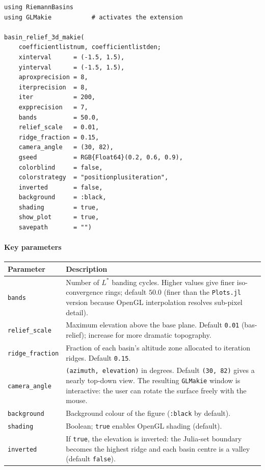 \documentclass[11pt,a4paper]{article}
\theoremstyle{definition}
\newcommand{\pkg}[1]{\texttt{#1}}
\begin{document}
\begin{lstlisting}
using RiemannBasins
using GLMakie           # activates the extension

basin_relief_3d_makie(
    coefficientlistnum, coefficientlistden;
    xinterval      = (-1.5, 1.5),
    yinterval      = (-1.5, 1.5),
    aproxprecision = 8,
    iterprecision  = 8,
    iter           = 200,
    expprecision   = 7,
    bands          = 50.0,
    relief_scale   = 0.01,
    ridge_fraction = 0.15,
    camera_angle   = (30, 82),
    gseed          = RGB{Float64}(0.2, 0.6, 0.9),
    colorblind     = false,
    colorstrategy  = "positionplusiteration",
    inverted       = false,
    background     = :black,
    shading        = true,
    show_plot      = true,
    savepath       = "")
\end{lstlisting}

\paragraph{Key parameters}

\begin{center}
\renewcommand{\arraystretch}{1.25}
\begin{tabular}{lp{8.5cm}}
\toprule
Parameter & Description \\
\midrule
\texttt{bands} &
  Number of $L^*$ banding cycles.  Higher values give finer iso-convergence
  rings; default $50.0$ (finer than the \pkg{Plots.jl} version because
  OpenGL interpolation resolves sub-pixel detail).\\
\texttt{relief\_scale} &
  Maximum elevation above the base plane.  Default \texttt{0.01}
  (bas-relief); increase for more dramatic topography.\\
\texttt{ridge\_fraction} &
  Fraction of each basin's altitude zone allocated to iteration ridges.
  Default \texttt{0.15}.\\
\texttt{camera\_angle} &
  \texttt{(azimuth, elevation)} in degrees.
  Default \texttt{(30, 82)} gives a nearly top-down view.
  The resulting \pkg{GLMakie} window is interactive: the user can rotate
  the surface freely with the mouse.\\
\texttt{background} &
  Background colour of the figure (\texttt{:black} by default).\\
\texttt{shading} &
  Boolean; \texttt{true} enables OpenGL shading (default).\\
\texttt{inverted} &
  If \texttt{true}, the elevation is inverted: the Julia-set boundary
  becomes the highest ridge and each basin centre is a valley
  (default \texttt{false}).\\
\bottomrule
\end{tabular}
\end{center}
\end{document}
